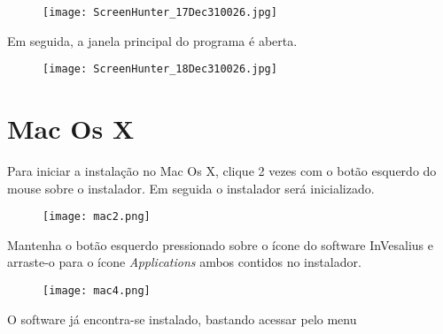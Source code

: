 \begin{figure}[!htb]
\centering
\texttt{[image: ScreenHunter\_17Dec310026.jpg]}
\end{figure}

\hspace{.2cm}

Em seguida, a janela principal do programa é aberta.

\begin{figure}[!htb]
\centering
\texttt{[image: ScreenHunter\_18Dec310026.jpg]}
\end{figure}

\section{Mac Os X}

Para iniciar a instalação no Mac Os X, clique 2 vezes com o botão esquerdo do mouse sobre o instalador.
Em seguida o instalador será inicializado.

\begin{figure}[!htb]
\centering
\texttt{[image: mac2.png]}
\end{figure}

Mantenha o botão esquerdo pressionado sobre o ícone do software InVesalius e arraste-o para o ícone \textit{Applications}
ambos contidos no instalador.

\begin{figure}[!htb]
\centering
\texttt{[image: mac4.png]}
\end{figure}

O software já encontra-se instalado, bastando acessar pelo menu
